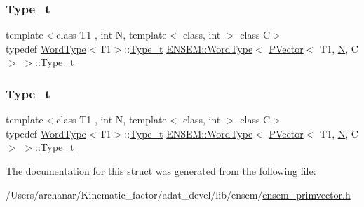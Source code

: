 \subsubsection{\texorpdfstring{Type\_t}{Type\_t}\hspace{0.1cm}{\footnotesize\ttfamily [1/2]}}
{\footnotesize\ttfamily template$<$class T1 , int N, template$<$ class, int $>$ class C$>$ \\
typedef \mbox{\hyperlink{structENSEM_1_1WordType}{Word\+Type}}$<$T1$>$\+::\mbox{\hyperlink{structENSEM_1_1WordType_3_01PVector_3_01T1_00_01N_00_01C_01_4_01_4_aa9f3aa443de1a825586cd47f6d842fe8}{Type\+\_\+t}} \mbox{\hyperlink{structENSEM_1_1WordType}{E\+N\+S\+E\+M\+::\+Word\+Type}}$<$ \mbox{\hyperlink{classENSEM_1_1PVector}{P\+Vector}}$<$ T1, \mbox{\hyperlink{operator__name__util_8cc_a7722c8ecbb62d99aee7ce68b1752f337}{N}}, C $>$ $>$\+::\mbox{\hyperlink{structENSEM_1_1WordType_3_01PVector_3_01T1_00_01N_00_01C_01_4_01_4_aa9f3aa443de1a825586cd47f6d842fe8}{Type\+\_\+t}}}

\mbox{\label{structENSEM_1_1WordType_3_01PVector_3_01T1_00_01N_00_01C_01_4_01_4_aa9f3aa443de1a825586cd47f6d842fe8}} 
\subsubsection{\texorpdfstring{Type\_t}{Type\_t}\hspace{0.1cm}{\footnotesize\ttfamily [2/2]}}
{\footnotesize\ttfamily template$<$class T1 , int N, template$<$ class, int $>$ class C$>$ \\
typedef \mbox{\hyperlink{structENSEM_1_1WordType}{Word\+Type}}$<$T1$>$\+::\mbox{\hyperlink{structENSEM_1_1WordType_3_01PVector_3_01T1_00_01N_00_01C_01_4_01_4_aa9f3aa443de1a825586cd47f6d842fe8}{Type\+\_\+t}} \mbox{\hyperlink{structENSEM_1_1WordType}{E\+N\+S\+E\+M\+::\+Word\+Type}}$<$ \mbox{\hyperlink{classENSEM_1_1PVector}{P\+Vector}}$<$ T1, \mbox{\hyperlink{operator__name__util_8cc_a7722c8ecbb62d99aee7ce68b1752f337}{N}}, C $>$ $>$\+::\mbox{\hyperlink{structENSEM_1_1WordType_3_01PVector_3_01T1_00_01N_00_01C_01_4_01_4_aa9f3aa443de1a825586cd47f6d842fe8}{Type\+\_\+t}}}



The documentation for this struct was generated from the following file\+:\begin{DoxyCompactItemize}
\item 
/\+Users/archanar/\+Kinematic\+\_\+factor/adat\+\_\+devel/lib/ensem/\mbox{\hyperlink{lib_2ensem_2ensem__primvector_8h}{ensem\+\_\+primvector.\+h}}\end{DoxyCompactItemize}
